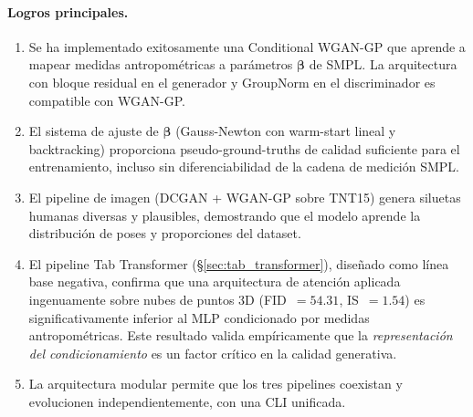 \documentclass[a4paper,11pt]{article}
\begin{document}
\paragraph{Logros principales.}
\begin{enumerate}
    \item Se ha implementado exitosamente una Conditional WGAN-GP que aprende
          a mapear medidas antropométricas a parámetros $\bm{\beta}$ de SMPL.
          La arquitectura con bloque residual en el generador y GroupNorm en el
          discriminador es compatible con WGAN-GP.
    \item El sistema de ajuste de $\bm{\beta}$ (Gauss-Newton con warm-start
          lineal y backtracking) proporciona pseudo-ground-truths de calidad
          suficiente para el entrenamiento, incluso sin diferenciabilidad de
          la cadena de medición SMPL.
    \item El pipeline de imagen (DCGAN + WGAN-GP sobre TNT15) genera siluetas
          humanas diversas y plausibles, demostrando que el modelo aprende la
          distribución de poses y proporciones del dataset.
    \item El pipeline Tab Transformer (§\ref{sec:tab_transformer}), diseñado
          como línea base negativa, confirma que una arquitectura de atención
          aplicada ingenuamente sobre nubes de puntos 3D
          (FID~$= 54.31$, IS~$= 1.54$) es significativamente inferior al
          MLP condicionado por medidas antropométricas. Este resultado valida
          empíricamente que la \emph{representación del condicionamiento} es
          un factor crítico en la calidad generativa.
    \item La arquitectura modular permite que los tres pipelines coexistan y
          evolucionen independientemente, con una CLI unificada.
\end{enumerate}
\end{document}
